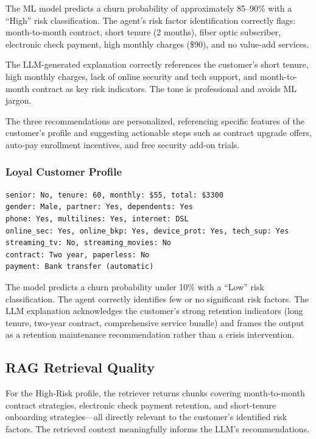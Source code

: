 The ML model predicts a churn probability of approximately 85--90\% with a ``High'' risk
classification. The agent's risk factor identification correctly flags: month-to-month
contract, short tenure (2 months), fiber optic subscriber, electronic check payment,
high monthly charges (\$90), and no value-add services.

The LLM-generated explanation correctly references the customer's short tenure, high
monthly charges, lack of online security and tech support, and month-to-month contract
as key risk indicators. The tone is professional and avoids ML jargon.

The three recommendations are personalized, referencing specific features of the
customer's profile and suggesting actionable steps such as contract upgrade offers,
auto-pay enrollment incentives, and free security add-on trials.

\subsubsection{Loyal Customer Profile}

\begin{lstlisting}[caption=Loyal customer input features.]
senior: No, tenure: 60, monthly: $55, total: $3300
gender: Male, partner: Yes, dependents: Yes
phone: Yes, multilines: Yes, internet: DSL
online_sec: Yes, online_bkp: Yes, device_prot: Yes, tech_sup: Yes
streaming_tv: No, streaming_movies: No
contract: Two year, paperless: No
payment: Bank transfer (automatic)
\end{lstlisting}

The model predicts a churn probability under 10\% with a ``Low'' risk classification.
The agent correctly identifies few or no significant risk factors. The LLM explanation
acknowledges the customer's strong retention indicators (long tenure, two-year contract,
comprehensive service bundle) and frames the output as a retention maintenance
recommendation rather than a crisis intervention.

\subsection{RAG Retrieval Quality}

For the High-Risk profile, the retriever returns chunks covering month-to-month contract
strategies, electronic check payment retention, and short-tenure onboarding strategies---all
directly relevant to the customer's identified risk factors. The retrieved context
meaningfully informs the LLM's recommendations.

